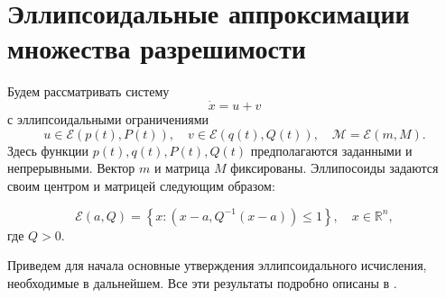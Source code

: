 \section{Эллипсоидальные аппроксимации множества разрешимости}
Будем рассматривать систему
\begin{equation*}
    \dot{x} = u + v
\end{equation*}
с эллипсоидальными ограничениями
\begin{equation*}
    u \in \mathcal{E}(p(t), P(t)), \quad v \in \mathcal{E}(q(t), Q(t)), \quad \mathcal{M} = 
     \mathcal{E}(m, M).
\end{equation*}
Здесь функции \( p(t), q(t), P(t), Q(t) \) предполагаются заданными и непрерывными. Вектор \( m \) и
 матрица \( M \) фиксированы. Эллипосоиды задаются своим центром и матрицей следующим образом:
 
\begin{equation}
    \mathcal{E}(a, Q) = \left\{ x : (x - a, Q^{-1}(x - a)) \le 1 \right\}, \quad x \in \mathbb{R}^n,
\end{equation}
где \( Q > 0 \).

Приведем для начала основные утверждения эллипсоидального исчисления, необходимые в дальнейшем. Все
 эти результаты подробно описаны в \cite{ellips_calculus}.


